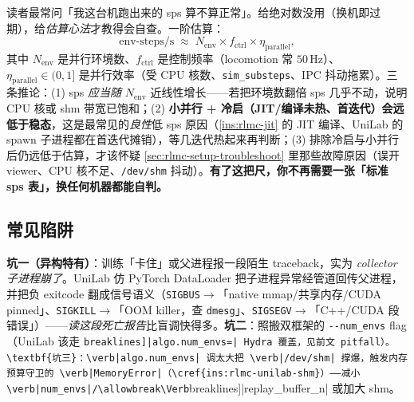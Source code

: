 \begin{insight}\label{ins:rlmc-throughput-sanity}
读者最常问「我这台机跑出来的 sps 算不算正常」。给绝对数没用（换机即过期），给\emph{估算心法}才教得会自查。一阶估算：\[\text{env-steps/s}\;\approx\;N_{\text{env}}\times f_{\text{ctrl}}\times \eta_{\text{parallel}},\]其中 $N_{\text{env}}$ 是并行环境数、$f_{\text{ctrl}}$ 是控制频率（locomotion 常 $50\,$Hz）、$\eta_{\text{parallel}}\in(0,1]$ 是并行效率（受 CPU 核数、\verb|sim_substeps|、IPC 抖动拖累）。三条推论：(1) sps \emph{应当随} $N_{\text{env}}$ 近线性增长——若把环境数翻倍 sps 几乎不动，说明 CPU 核或 shm 带宽已饱和；(2) \textbf{小并行 + 冷启（JIT/编译未热、首迭代）会远低于稳态}，这是最常见的\emph{良性}低 sps 原因（\cref{ins:rlmc-jit} 的 JIT 编译、UniLab 的 spawn 子进程都在首迭代摊销），等几迭代热起来再判断；(3) 排除冷启与小并行后仍远低于估算，才该怀疑 \cref{sec:rlmc-setup-troubleshoot} 里那些故障原因（误开 viewer、CPU 核不足、\verb|/dev/shm| 抖动）。\textbf{有了这把尺，你不再需要一张「标准 sps 表」，换任何机器都能自判。}
\end{insight}

\subsection{常见陷阱}

\begin{pitfall}
\textbf{坑一（异构特有）}：训练「卡住」或父进程报一段陌生 traceback，实为 \emph{collector 子进程崩了}。UniLab 仿 PyTorch DataLoader 把子进程异常经管道回传父进程，并把负 exitcode 翻成信号语义（\verb|SIGBUS|$\to$「native mmap/共享内存/CUDA pinned」、\verb|SIGKILL|$\to$「OOM killer，查 \texttt{dmesg}」、\verb|SIGSEGV|$\to$「C++/CUDA 段错误」）——\emph{读这段死亡报告}比盲调快得多。\textbf{坑二}：照搬双框架的 \verb|--num_envs| flag（UniLab 该走 \Verb[breaklines]|algo.num_envs=| Hydra 覆盖，见前文 pitfall）。\textbf{坑三}：\verb|algo.num_envs| 调太大把 \verb|/dev/shm| 撑爆，触发内存预算守卫的 \verb|MemoryError|（\cref{ins:rlmc-unilab-shm}）——减小 \verb|num_envs|/\allowbreak\Verb[breaklines]|replay_buffer_n| 或加大 shm。
\end{pitfall}

\begin{practice}
\end{practice}

